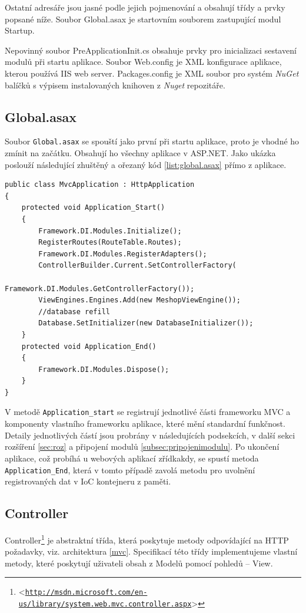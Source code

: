 \documentclass[11pt,twoside,a4paper]{book}
\let\oldUrl\url
\renewcommand\url[1]{<\texttt{\oldUrl{#1}}>}
\begin{document}
Ostatní adresáře jsou jasné podle jejich pojmenování a obsahují třídy a prvky popsané níže. Soubor \textsf{Global.asax} je startovním souborem zastupující modul \textsf{Startup}. 

Nepovinný soubor \textsf{PreApplicationInit.cs} obsahuje prvky pro inicializaci sestavení modulů při startu aplikace. Soubor \textsf{Web.config} je XML konfigurace aplikace, kterou používá IIS web server. \textsf{Packages.config} je XML soubor pro systém \textit{NuGet} balíčků s výpisem instalovaných knihoven z \textit{Nuget} repozitáře.


\subsection{Global.asax}
Soubor \texttt{Global.asax} se spouští jako první při startu aplikace, proto je vhodné ho zmínit na začátku. Obsahují ho všechny aplikace v ASP.NET. Jako ukázka poslouží následující zhuštěný a ořezaný kód \ref{list:global.asax} přímo z aplikace. 

\begin{lstlisting}[float=h!,language=CSharp, caption={Global.asax}, label=list:global.asax]
public class MvcApplication : HttpApplication
{
    protected void Application_Start()
    {
        Framework.DI.Modules.Initialize();
        RegisterRoutes(RouteTable.Routes);          
        Framework.DI.Modules.RegisterAdapters();
        ControllerBuilder.Current.SetControllerFactory(
        						Framework.DI.Modules.GetControllerFactory());
        ViewEngines.Engines.Add(new MeshopViewEngine());
        //database refill
        Database.SetInitializer(new DatabaseInitializer()); 
    }
    protected void Application_End()
    {
        Framework.DI.Modules.Dispose();
    }
}
\end{lstlisting}

V metodě \texttt{Application\_start} se registrují jednotlivé části frameworku MVC a komponenty vlastního frameworku aplikace, které mění standardní funkčnost. Detaily jednotlivých částí jsou probrány v následujících podsekcích, v další sekci rozšíření \ref{sec:roz} a připojení modulů \ref{subsec:pripojenimodulu}. Po ukončení aplikace, což probíhá u webových aplikací zřídkakdy, se spustí metoda \texttt{Application\_End}, která v tomto případě zavolá metodu pro uvolnění registrovaných dat v IoC kontejneru z paměti.


\subsection{Controller}
Controller\footnote{\url{http://msdn.microsoft.com/en-us/library/system.web.mvc.controller.aspx}} je abstraktní třída, která poskytuje metody odpovídající na HTTP požadavky, viz. architektura \ref{mvc}. Specifikací této třídy implementujeme vlastní metody, které poskytují uživateli obsah z \textsf{Model}ů  pomocí pohledů -- \textsf{View}. 
\end{document}
